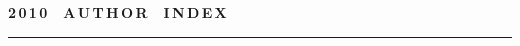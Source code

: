 \def\stat{cont-e}
{%
\raggedleft\Large \bf%
2\,0\,1\,0\ \ A\,U\,T\,H\,O\,R\ \ I\,N\,D\,E\,X \vskip 17pt
    \hrule
    \par
{} }

\label{st\stat}

\def\tit{\ }

\def\aut{\ }
\def\auf{\ }

\def\leftkol{\ } %

\def\rightkol{\ } %

\titele{\tit}{\aut}{\auf}{\leftkol}{\rightkol}

\vspace*{-12pt}

